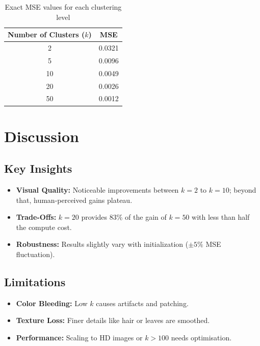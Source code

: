 \documentclass{article}
\begin{document}
\begin{table}[H]

\begin{adjustwidth}{1.5cm}{}
\centering
    \begin{tabular}{cc}
        \toprule
        Number of Clusters (\(k\)) & MSE \\
        \midrule
        2 & 0.0321 \\
        5 & 0.0096 \\
        10 & 0.0049 \\
        20 & 0.0026 \\
        50 & 0.0012 \\
        \bottomrule
    \end{tabular}
    \caption{Exact MSE values for each clustering level}
    \label{tab:mse}
\end{adjustwidth}
\end{table}

\section{Discussion}
\subsection{Key Insights}
\begin{adjustwidth}{1cm}{}
\begin{itemize}
    \item \textbf{Visual Quality:} Noticeable improvements between \(k = 2\) to \(k = 10\); beyond that, human-perceived gains plateau.
    \item \textbf{Trade-Offs:} \(k = 20\) provides 83\% of the gain of \(k = 50\) with less than half the compute cost.
    \item \textbf{Robustness:} Results slightly vary with initialization (\(\pm 5\%\) MSE fluctuation).
\end{itemize}
\end{adjustwidth}

\subsection{Limitations}
\begin{adjustwidth}{1cm}{}
\begin{itemize}
    \item \textbf{Color Bleeding:} Low \(k\) causes artifacts and patching.
    \item \textbf{Texture Loss:} Finer details like hair or leaves are smoothed.
    \item \textbf{Performance:} Scaling to HD images or \(k>100\) needs optimisation.
\end{itemize}
\end{adjustwidth}
\end{document}
